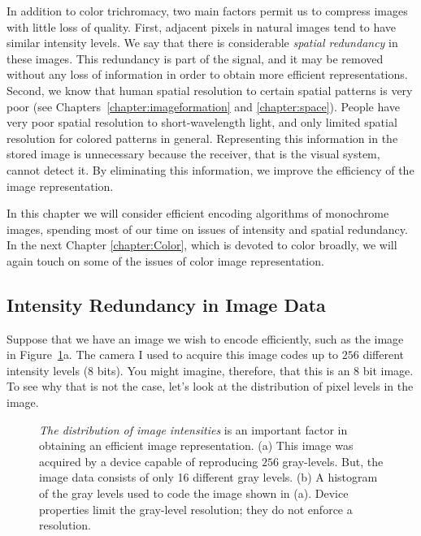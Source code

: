 In addition to color trichromacy, two main factors permit us to
compress images with little loss of quality.  First, adjacent pixels
in natural images tend to have similar intensity levels.  We say that
there is considerable {\em spatial redundancy} in these images.  This
redundancy is part of the signal, and it may be removed without any
loss of information in order to obtain more efficient representations.
Second, we know that human spatial resolution to certain spatial
patterns is very poor (see Chapters~\ref{chapter:imageformation} and
\ref{chapter:space}).  People have very poor spatial resolution to
short-wavelength light, and only limited spatial resolution for
colored patterns in general.  Representing this information in the
stored image is unnecessary because the receiver, that is the visual
system, cannot detect it.  By eliminating this information, we improve
the efficiency of the image representation.

In this chapter we will consider efficient encoding algorithms of
monochrome images, spending most of our time on issues of intensity
and spatial redundancy.  In the next Chapter \ref{chapter:Color},
which is devoted to color broadly, we will again touch on some of the
issues of color image representation.

\subsection*{Intensity Redundancy in Image Data} Suppose that we have
an image we wish to encode efficiently, such as the image in
Figure~\ref{f7:grayResolution}a.  The camera I used to acquire this
image codes up to $256$ different intensity levels ($8$ bits).  You
might imagine, therefore, that this is an $8$ bit image.  To see why
that is not the case, let's look at the distribution of pixel levels
in the image.

\begin{figure}
\centerline{  }
\caption[Gray Scale Resolution]{ {\em The distribution of image
intensities} is an important factor in obtaining an efficient image
representation.  (a) This image was acquired by a device capable of
reproducing $256$ gray-levels.  But, the image data consists of only
16 different gray levels.  (b) A histogram of the gray levels used to
code the image shown in (a).  Device properties limit the gray-level
resolution; they do not enforce a resolution.  }
\label{f7:grayResolution}
\end{figure}

